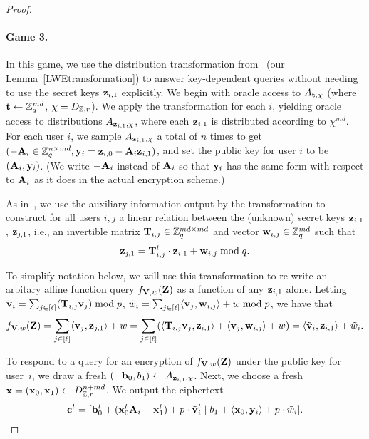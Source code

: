 \begin{proof}
  \paragraph{Game 3.} In this game, we use the \lwe distribution
  transformation from~\cite{DBLP:conf/crypto/ApplebaumCPS09} (our
  Lemma~\ref{LWEtransformation}) to answer key-dependent queries
  without needing to use the secret keys $\mathbf{z}_{i,1}$ explicitly.  We
  begin with oracle access to $A_{\mathbf{t}, \chi}$ (where $\mathbf{t} \gets
  \mathbb{Z}_q^{md}$, $\chi=D_{\mathbb{Z}, r}$).  We apply the transformation for each
  $i$, yielding oracle access to distributions $A_{\mathbf{z}_{i,1},\chi}$,
  where each $\mathbf{z}_{i,1}$ is distributed according to $\chi^{md}$.
  For each user $i$, we sample $A_{\mathbf{z}_{i,1},\chi}$ a total of $n$
  times to get $(-\mathbf{A}_i \in \mathbb{Z}_q^{n \times md}, \mathbf{y}_i =
  \mathbf{z}_{i,0}-\mathbf{A}_i\mathbf{z}_{i,1})$, and set the public key for user
  $i$ to be $(\mathbf{A}_i, \mathbf{y}_i)$.  (We write $-\mathbf{A}_i$ instead of
  $\mathbf{A}_i$ so that $\mathbf{y}_i$ has the same form with respect to
  $\mathbf{A}_{i}$ as it does in the actual encryption scheme.)

  As in~\cite{DBLP:conf/crypto/ApplebaumCPS09}, we use the auxiliary
  information output by the \lwe transformation to construct for all
  users $i,j$ a linear relation between the (unknown) secret keys
  $\mathbf{z}_{i,1}$, $\mathbf{z}_{j,1}$, i.e., an invertible matrix
  $\mathbf{T}_{i,j} \in \mathbb{Z}_q^{md \times md}$ and vector $\mathbf{w}_{i,j} \in
  \mathbb{Z}_q^{md}$ such that
  \begin{equation}
    \label{transformeq}
    \mathbf{z}_{j,1} = \mathbf{T}_{i,j}^{t} \cdot \mathbf{z}_{i,1}+\mathbf{w}_{i,j} \bmod q.
  \end{equation}

   To simplify notation below, we will use this transformation
  to re-write an arbitary affine function query $f_{\mathbf{V},w}(\mathbf{Z})$
  as a function of any 
  $\mathbf{z}_{i,1}$ alone. Letting $\tilde{\mathbf{v}}_i=\sum_{j \in
    [\ell]}(\mathbf{T}_{i,j}\mathbf{v}_j) \bmod p$, $\tilde{w}_i =\sum_{j \in
    [\ell]}\langle{\ensuremath{\mathbf{v}}_j, \ensuremath{\mathbf{w}}_{i,j}}\rangle+w \bmod p$, we have that
\[f_{\mathbf{V}, w}(\mathbf{Z})= \sum_{j
    \in [\ell]}\langle{\ensuremath{\mathbf{v}}_j,\ensuremath{\mathbf{z}}_{j,1}}\rangle+w = 
\sum_{j \in [\ell]}(\langle{\ensuremath{\mathbf{T}}_{i,j}\ensuremath{\mathbf{v}}_j, \ensuremath{\mathbf{z}}_{i,1}}\rangle + \langle{\ensuremath{\mathbf{v}}_{j}, \ensuremath{\mathbf{w}}_{i,j}}\rangle+w)=\langle{\tilde{\ensuremath{\mathbf{v}}}_{i}, \ensuremath{\mathbf{z}}_{i,1}}\rangle+\tilde{w}_{i}.\] 

To respond to a query for an encryption of $f_{\mathbf{V},w}(\mathbf{Z})$ under
the public key for user~$i$, we draw a fresh $(-\mathbf{b}_0, b_1) \gets
A_{\mathbf{z}_{i,1}, \chi}$.  Next, we choose a fresh
$\mathbf{x}=(\mathbf{x}_{0},\mathbf{x}_{1}) \gets D_{\mathbb{Z}, r}^{n+md}$.  We output the
ciphertext
  \[\mathbf{c}^t = [\mathbf{b}_0^t + (\mathbf{x}_{0}^{t}\mathbf{A}_{i} + \mathbf{x}_{1}^{t})
  + p \cdot \tilde{\mathbf{v}}_{i}^{t} \mid b_1 +
  \langle{\ensuremath{\mathbf{x}}_{0}, \ensuremath{\mathbf{y}}_i}\rangle + p \cdot \tilde{w}_{i}].\]


\end{proof}
